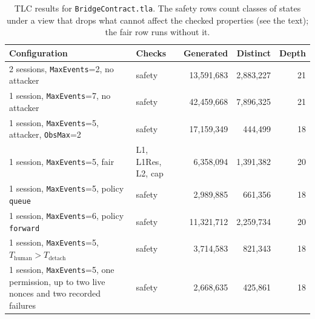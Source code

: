 \begin{table}[htbp]
\centering
\caption{TLC results for \texttt{BridgeContract.tla}. The safety rows count
classes of states under a view that drops what cannot affect the checked
properties (see the text); the fair row runs without it.}
\label{tab:tlc}
\small
\begin{tabularx}{\columnwidth}{X l r r r}
\toprule
\textbf{Configuration} & \textbf{Checks} & \textbf{Generated} & \textbf{Distinct} & \textbf{Depth} \\
\midrule
2 sessions, \texttt{MaxEvents}=2, no attacker & safety & 13,591,683 & 2,883,227 & 21 \\
1 session, \texttt{MaxEvents}=7, no attacker & safety & 42,459,668 & 7,896,325 & 21 \\
1 session, \texttt{MaxEvents}=5, attacker, \texttt{ObsMax}=2 & safety & 17,159,349 & 444,499 & 18 \\
1 session, \texttt{MaxEvents}=5, fair & L1, L1Res, L2, cap & 6,358,094 & 1,391,382 & 20 \\
1 session, \texttt{MaxEvents}=5, policy \texttt{queue} & safety & 2,989,885 & 661,356 & 18 \\
1 session, \texttt{MaxEvents}=6, policy \texttt{forward} & safety & 11,321,712 & 2,259,734 & 20 \\
1 session, \texttt{MaxEvents}=5, $T_{\text{human}} > T_{\text{detach}}$ & safety & 3,714,583 & 821,343 & 18 \\
1 session, \texttt{MaxEvents}=5, one permission, up to two live nonces and two recorded failures & safety & 2,668,635 & 425,861 & 18 \\
\bottomrule
\end{tabularx}
\end{table}

